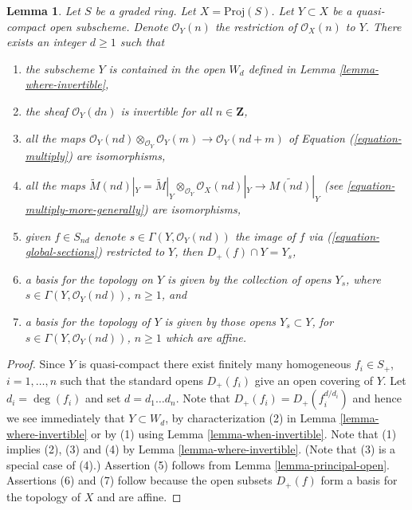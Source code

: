 \documentclass{stacks-project}
\theoremstyle{plain}
\newtheorem{lemma}[subsection]{Lemma}
\theoremstyle{definition}
\theoremstyle{remark}
\numberwithin{equation}{subsection}
\begin{document}
\begin{lemma}
\label{lemma-ample-on-proj}
Let $S$ be a graded ring.
Let $X = \text{Proj}(S)$.
Let $Y \subset X$ be a quasi-compact open subscheme.
Denote $\mathcal{O}_Y(n)$ the restriction of
$\mathcal{O}_X(n)$ to $Y$.
There exists an integer $d \geq 1$ such that
\begin{enumerate}
\item the subscheme $Y$ is contained in the open $W_d$ defined
in Lemma \ref{lemma-where-invertible},
\item the sheaf $\mathcal{O}_Y(dn)$ is invertible for all $n \in \mathbf{Z}$,
\item all the maps
$\mathcal{O}_Y(nd) \otimes_{\mathcal{O}_Y} \mathcal{O}_Y(m)
\longrightarrow
\mathcal{O}_Y(nd + m)$
of Equation (\ref{equation-multiply}) are isomorphisms,
\item all the maps
$\widetilde M(nd)|_Y = \widetilde M|_Y \otimes_{\mathcal{O}_Y}
\mathcal{O}_X(nd)|_Y \to \widetilde{M(nd)}|_Y$
(see \ref{equation-multiply-more-generally}) are isomorphisms,
\item given $f \in S_{nd}$ denote $s \in \Gamma(Y, \mathcal{O}_Y(nd))$
the image of $f$ via (\ref{equation-global-sections})
restricted to $Y$, then $D_{+}(f) \cap Y = Y_s$,
\item a basis for the topology on $Y$ is given
by the collection of opens $Y_s$, where $s \in \Gamma(Y, \mathcal{O}_Y(nd))$,
$n \geq 1$, and
\item a basis for the topology of $Y$ is given
by those opens $Y_s \subset Y$, for
$s \in \Gamma(Y, \mathcal{O}_Y(nd))$, $n \geq 1$ which are affine.
\end{enumerate}
\end{lemma}

\begin{proof}
Since $Y$ is quasi-compact there exist finitely many homogeneous
$f_i \in S_{+}$, $i = 1, \ldots, n$ such that the standard opens
$D_{+}(f_i)$ give an open covering of $Y$. Let $d_i = \deg(f_i)$ and set
$d = d_1 \ldots d_n$. Note that $D_{+}(f_i) = D_{+}(f_i^{d/d_i})$
and hence we see immediately that $Y \subset W_d$, by characterization
(2) in Lemma \ref{lemma-where-invertible} or
by (1) using Lemma \ref{lemma-when-invertible}.
Note that (1) implies (2), (3) and (4) by Lemma \ref{lemma-where-invertible}.
(Note that (3) is a special case of (4).)
Assertion (5) follows from Lemma \ref{lemma-principal-open}.
Assertions (6) and (7) follow because the open subsets $D_{+}(f)$
form a basis for the topology of $X$ and are affine.
\end{proof}
\end{document}
